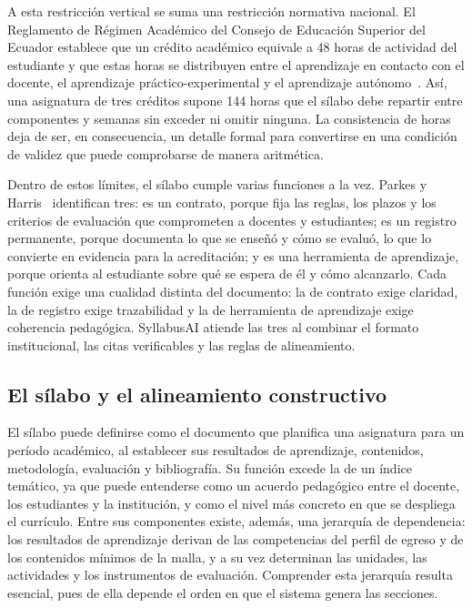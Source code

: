 A esta restricción vertical se suma una restricción normativa nacional. El Reglamento de Régimen Académico del Consejo de Educación Superior del Ecuador establece que un crédito académico equivale a 48 horas de actividad del estudiante y que estas horas se distribuyen entre el aprendizaje en contacto con el docente, el aprendizaje práctico-experimental y el aprendizaje autónomo~\cite{ces2022rra}. Así, una asignatura de tres créditos supone 144 horas que el sílabo debe repartir entre componentes y semanas sin exceder ni omitir ninguna. La consistencia de horas deja de ser, en consecuencia, un detalle formal para convertirse en una condición de validez que puede comprobarse de manera aritmética.

Dentro de estos límites, el sílabo cumple varias funciones a la vez. Parkes y Harris~\cite{parkes2002syllabus} identifican tres: es un contrato, porque fija las reglas, los plazos y los criterios de evaluación que comprometen a docentes y estudiantes; es un registro permanente, porque documenta lo que se enseñó y cómo se evaluó, lo que lo convierte en evidencia para la acreditación; y es una herramienta de aprendizaje, porque orienta al estudiante sobre qué se espera de él y cómo alcanzarlo. Cada función exige una cualidad distinta del documento: la de contrato exige claridad, la de registro exige trazabilidad y la de herramienta de aprendizaje exige coherencia pedagógica. SyllabusAI atiende las tres al combinar el formato institucional, las citas verificables y las reglas de alineamiento.

\subsection{El sílabo y el alineamiento constructivo}
El sílabo puede definirse como el documento que planifica una asignatura para un período académico, al establecer sus resultados de aprendizaje, contenidos, metodología, evaluación y bibliografía. Su función excede la de un índice temático, ya que puede entenderse como un acuerdo pedagógico entre el docente, los estudiantes y la institución, y como el nivel más concreto en que se despliega el currículo. Entre sus componentes existe, además, una jerarquía de dependencia: los resultados de aprendizaje derivan de las competencias del perfil de egreso y de los contenidos mínimos de la malla, y a su vez determinan las unidades, las actividades y los instrumentos de evaluación. Comprender esta jerarquía resulta esencial, pues de ella depende el orden en que el sistema genera las secciones.

